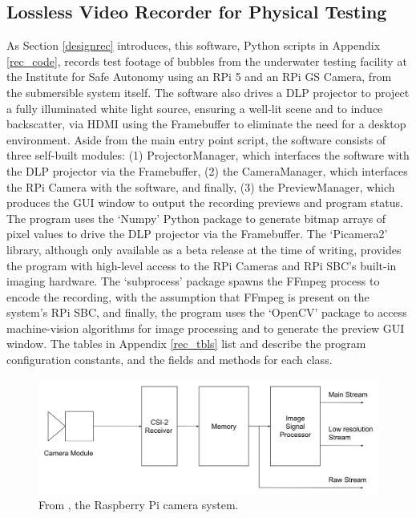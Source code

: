 \subsection{Lossless Video Recorder for Physical Testing}
\label{pirec_impl}

As Section \ref{designrec} introduces, this software, Python scripts in Appendix \ref{rec_code}, records test footage of bubbles from the underwater testing facility at the Institute for Safe Autonomy using an RPi 5 and an RPi GS Camera, from the submersible system itself. The software also drives a DLP projector to project a fully illuminated white light source, ensuring a well-lit scene and to induce backscatter, via HDMI using the Framebuffer to eliminate the need for a desktop environment. Aside from the main entry point script, the software consists of three self-built modules: (1) ProjectorManager, which interfaces the software with the DLP projector via the Framebuffer, (2) the CameraManager, which interfaces the RPi Camera with the software, and finally, (3) the PreviewManager, which produces the GUI window to output the recording previews and program status. The program uses the `Numpy' Python package to generate bitmap arrays of pixel values to drive the DLP projector via the Framebuffer. The `Picamera2' library, although only available as a beta release at the time of writing, provides the program with high-level access to the RPi Cameras and RPi SBC's built-in imaging hardware. The `subprocess' package spawns the FFmpeg process to encode the recording, with the assumption that FFmpeg is present on the system's RPi SBC, and finally, the program uses the `OpenCV' package to access machine-vision algorithms for image processing and to generate the preview GUI window. The tables in Appendix \ref{rec_tbls} list and describe the program configuration constants, and the fields and methods for each class.

\begin{figure}[H]
    \centering
    \includegraphics[width=1\textwidth]{assets/picamera-system.png}
    \caption{From \cite{raspberrypiltdPicamera2Library2024}, the Raspberry Pi camera system.}
    \label{fig:picam_system}
\end{figure}

